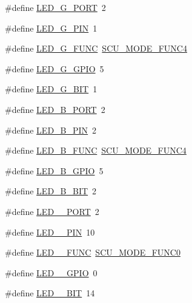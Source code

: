 \begin{DoxyCompactItemize}
\#define \hyperlink{group__samples_ga1ef377b425c83109ec7998dc6fa71345}{L\+E\+D\+\_\+\+G\+\_\+\+P\+O\+RT}~2
\item 
\#define \hyperlink{group__samples_ga3d793023ce3cf36a952b0b68ab1a389a}{L\+E\+D\+\_\+\+G\+\_\+\+P\+IN}~1
\item 
\#define \hyperlink{group__samples_ga5a49819d3be4ff9d93877a0cacb232f3}{L\+E\+D\+\_\+\+G\+\_\+\+F\+U\+NC}~\hyperlink{group___s_c_u__18_x_x__43_x_x_gaf1b58bdd83fd9b8331aaa1d54420a656}{S\+C\+U\+\_\+\+M\+O\+D\+E\+\_\+\+F\+U\+N\+C4}
\item 
\#define \hyperlink{group__samples_gab4f388402d4d678445fee6617f96128d}{L\+E\+D\+\_\+\+G\+\_\+\+G\+P\+IO}~5
\item 
\#define \hyperlink{group__samples_gae425f2df67fc802fcf8a442a57a92c81}{L\+E\+D\+\_\+\+G\+\_\+\+B\+IT}~1
\item 
\#define \hyperlink{group__samples_ga24baefd05a8dea1a7241e288a735c17c}{L\+E\+D\+\_\+\+B\+\_\+\+P\+O\+RT}~2
\item 
\#define \hyperlink{group__samples_gac210a43d7fede956117cfb90baff9511}{L\+E\+D\+\_\+\+B\+\_\+\+P\+IN}~2
\item 
\#define \hyperlink{group__samples_ga9e3fbcc848cb89567f5a0a217030ddff}{L\+E\+D\+\_\+\+B\+\_\+\+F\+U\+NC}~\hyperlink{group___s_c_u__18_x_x__43_x_x_gaf1b58bdd83fd9b8331aaa1d54420a656}{S\+C\+U\+\_\+\+M\+O\+D\+E\+\_\+\+F\+U\+N\+C4}
\item 
\#define \hyperlink{group__samples_ga91901ef42fb89387a433e685cb3f8745}{L\+E\+D\+\_\+\+B\+\_\+\+G\+P\+IO}~5
\item 
\#define \hyperlink{group__samples_ga50b5b18af7a51f83133cb0ad51380c7d}{L\+E\+D\+\_\+\+B\+\_\+\+B\+IT}~2
\item 
\#define \hyperlink{group__samples_ga2367ab7af33710f8502250e8bd2c1dc0}{L\+E\+D\+\_\+\_\+\+P\+O\+RT}~2
\item 
\#define \hyperlink{group__samples_ga620741f492787e04779bab21e6658113}{L\+E\+D\+\_\+\_\+\+P\+IN}~10
\item 
\#define \hyperlink{group__samples_gaf4e0ca171c51b5c66dd6249d767bac5e}{L\+E\+D\+\_\+\_\+\+F\+U\+NC}~\hyperlink{group___s_c_u__18_x_x__43_x_x_gaec79b551b98008d8986e719926f254bc}{S\+C\+U\+\_\+\+M\+O\+D\+E\+\_\+\+F\+U\+N\+C0}
\item 
\#define \hyperlink{group__samples_ga37154c806d85fb9f9158f86bb55e9ee0}{L\+E\+D\+\_\+\_\+\+G\+P\+IO}~0
\item 
\#define \hyperlink{group__samples_ga3fe9954e37c14ff0232f26822e5df035}{L\+E\+D\+\_\+\_\+\+B\+IT}~14

\end{DoxyCompactItemize}
